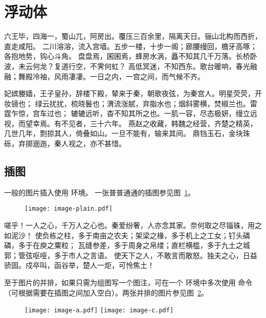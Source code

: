 \section{浮动体}
六王毕，四海一，蜀山兀，阿房出。覆压三百余里，隔离天日。骊山北构而西折，直走咸阳。
二川溶溶，流入宫墙。五步一楼，十步一阁；廊腰缦回，檐牙高啄；各抱地势，钩心斗角。
盘盘焉，囷囷焉，蜂房水涡，矗不知其几千万落。长桥卧波，未云何龙？复道行空，不霁何虹？
高低冥迷，不知西东。歌台暖响，春光融融；舞殿冷袖，风雨凄凄。一日之内，一宫之间，而气候不齐。

妃嫔媵嫱，王子皇孙，辞楼下殿，辇来于秦，朝歌夜弦，为秦宫人。明星荧荧，开妆镜也；
绿云扰扰，梳晓鬟也；渭流涨腻，弃脂水也；烟斜雾横，焚椒兰也。雷霆乍惊，宫车过也；
辘辘远听，杳不知其所之也。一肌一容，尽态极妍，缦立远视，而望幸焉。有不见者，三十六年。
燕赵之收藏，韩魏之经营，齐楚之精英，几世几年，剽掠其人，倚叠如山。一旦不能有，输来其间。
鼎铛玉石，金块珠砾，弃掷逦迤，秦人视之，亦不甚惜。

\subsection{插图}\label{subsec:fig}

一般的图片插入使用  环境。
一张普普通通的插图参见图~\ref{fig:a-single-image}。

\begin{figure}[H]
	\centering
	\texttt{[image: image-plain.pdf]}
	\label{fig:a-single-image}
\end{figure}

嗟乎！一人之心，千万人之心也。秦爱纷奢，人亦念其家。奈何取之尽锱铢，用之如泥沙！
使负栋之柱，多于南亩之农夫；架梁之椽，多于机上之工女；钉头磷磷，多于在庾之粟粒；
瓦缝参差，多于周身之帛缕；直栏横槛，多于九土之城郭；管弦呕哑，多于市人之言语。
使天下之人，不敢言而敢怒。独夫之心，日益骄固。戍卒叫，函谷举，楚人一炬，可怜焦土！

至于图片的并排，如果只需为组图写一个图注，可在一个  环境中多次使用  命令（可根据需要在插图之间加入空白）。两张并排的图片参见图~\ref{fig:abreast-image}。

\begin{figure}[htbp]
	\centering
	\texttt{[image: image-a.pdf]}
	\hspace{1cm}
	\texttt{[image: image-c.pdf]}
	\label{fig:abreast-image}
\end{figure}

